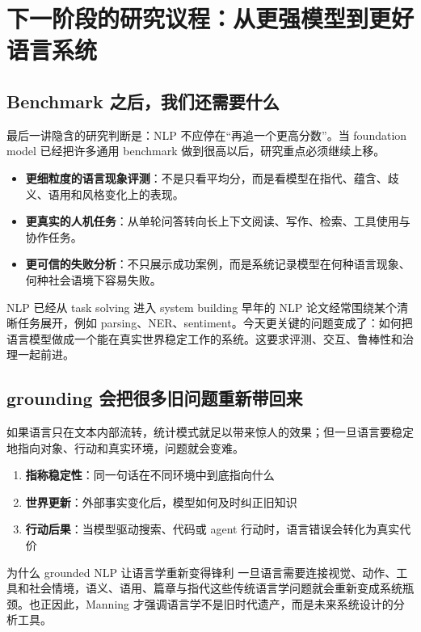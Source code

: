 \section{下一阶段的研究议程：从更强模型到更好语言系统}

\subsection{Benchmark 之后，我们还需要什么}

最后一讲隐含的研究判断是：NLP 不应停在``再追一个更高分数''。当 foundation model 已经把许多通用 benchmark 做到很高以后，研究重点必须继续上移。

\begin{itemize}
    \item \textbf{更细粒度的语言现象评测}：不是只看平均分，而是看模型在指代、蕴含、歧义、语用和风格变化上的表现。
    \item \textbf{更真实的人机任务}：从单轮问答转向长上下文阅读、写作、检索、工具使用与协作任务。
    \item \textbf{更可信的失败分析}：不只展示成功案例，而是系统记录模型在何种语言现象、何种社会语境下容易失败。
\end{itemize}

\begin{importantbox}{NLP 已经从 task solving 进入 system building}
早年的 NLP 论文经常围绕某个清晰任务展开，例如 parsing、NER、sentiment。今天更关键的问题变成了：如何把语言模型做成一个能在真实世界稳定工作的系统。这要求评测、交互、鲁棒性和治理一起前进。
\end{importantbox}

\subsection{grounding 会把很多旧问题重新带回来}

如果语言只在文本内部流转，统计模式就足以带来惊人的效果；但一旦语言要稳定地指向对象、行动和真实环境，问题就会变难。

\begin{enumerate}
    \item \textbf{指称稳定性}：同一句话在不同环境中到底指向什么
    \item \textbf{世界更新}：外部事实变化后，模型如何及时纠正旧知识
    \item \textbf{行动后果}：当模型驱动搜索、代码或 agent 行动时，语言错误会转化为真实代价
\end{enumerate}

\begin{knowledgebox}{为什么 grounded NLP 让语言学重新变得锋利}
一旦语言需要连接视觉、动作、工具和社会情境，语义、语用、篇章与指代这些传统语言学问题就会重新变成系统瓶颈。也正因此，Manning 才强调语言学不是旧时代遗产，而是未来系统设计的分析工具。
\end{knowledgebox}

